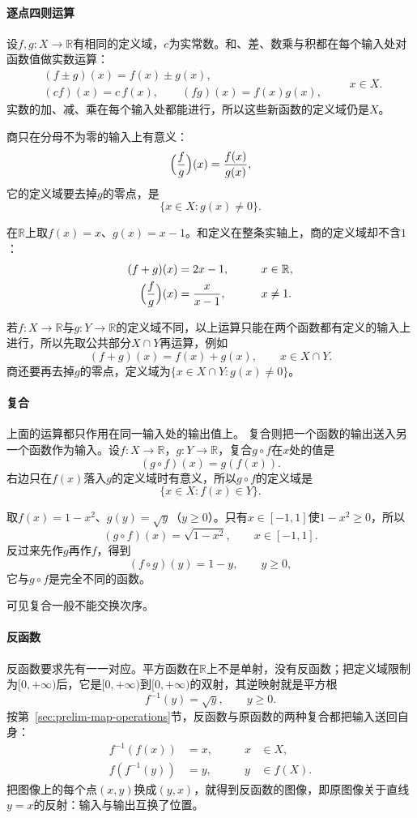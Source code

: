 \paragraph{逐点四则运算}
设$f,g:X\to\mathbb R$有相同的定义域，$c$为实常数。和、差、数乘与积都在每个输入处对函数值做实数运算：
\[
 \begin{gathered}
 (f\pm g)(x)=f(x)\pm g(x),\\
 (cf)(x)=c\,f(x),\qquad (fg)(x)=f(x)g(x),
 \end{gathered}
 \qquad x\in X.
\]
实数的加、减、乘在每个输入处都能进行，所以这些新函数的定义域仍是$X$。

商只在分母不为零的输入上有意义：
\[
 \Bigl(\frac fg\Bigr)(x)=\frac{f(x)}{g(x)},
\]
它的定义域要去掉$g$的零点，是
\[
 \{x\in X:g(x)\neq0\}.
\]
\begin{example}[和与商的定义域]
\label{ex:ru-sum-quotient-domain}
在$\mathbb R$上取$f(x)=x$、$g(x)=x-1$。和定义在整条实轴上，商的定义域却不含$1$：
\[
 \begin{aligned}
 (f+g)(x)&=2x-1, &\qquad x&\in\mathbb R,\\
 \Bigl(\frac fg\Bigr)(x)&=\frac{x}{x-1}, &\qquad x&\neq1.
 \end{aligned}
\]
\end{example}
若$f:X\to\mathbb R$与$g:Y\to\mathbb R$的定义域不同，以上运算只能在两个函数都有定义的输入上进行，所以先取公共部分$X\cap Y$再运算，例如
\[
 (f+g)(x)=f(x)+g(x),\qquad x\in X\cap Y.
\]
商还要再去掉$g$的零点，定义域为$\{x\in X\cap Y:g(x)\neq0\}$。

\paragraph{复合}
上面的运算都只作用在同一输入处的输出值上。
复合则把一个函数的输出送入另一个函数作为输入。设$f:X\to\mathbb R$，$g:Y\to\mathbb R$，复合$g\circ f$在$x$处的值是
\[
 (g\circ f)(x)=g(f(x)).
\]
右边只在$f(x)$落入$g$的定义域时有意义，所以$g\circ f$的定义域是
\[
 \{x\in X:f(x)\in Y\}.
\]
\begin{example}[复合的定义域与次序]
\label{ex:ru-composition-domain-order}
取$f(x)=1-x^2$、$g(y)=\sqrt y$（$y\geq0$）。只有$x\in[-1,1]$使$1-x^2\geq0$，所以
\[
 (g\circ f)(x)=\sqrt{1-x^2},\qquad x\in[-1,1].
\]
反过来先作$g$再作$f$，得到
\[
 (f\circ g)(y)=1-y,\qquad y\geq0,
\]
它与$g\circ f$是完全不同的函数。
\end{example}
可见复合一般不能交换次序。

\paragraph{反函数}
反函数要求先有一一对应。平方函数在$\mathbb R$上不是单射，没有反函数；把定义域限制为$[0,+\infty)$后，它是$[0,+\infty)$到$[0,+\infty)$的双射，其逆映射就是平方根
\[
 f^{-1}(y)=\sqrt y,\qquad y\geq0.
\]
按第~\ref{sec:prelim-map-operations}节，反函数与原函数的两种复合都把输入送回自身：
\[
 \begin{aligned}
 f^{-1}(f(x))&=x, &\qquad x&\in X,\\
 f(f^{-1}(y))&=y, &\qquad y&\in f(X).
 \end{aligned}
\]
把图像上的每个点$(x,y)$换成$(y,x)$，就得到反函数的图像，即原图像关于直线$y=x$的反射：输入与输出互换了位置。

